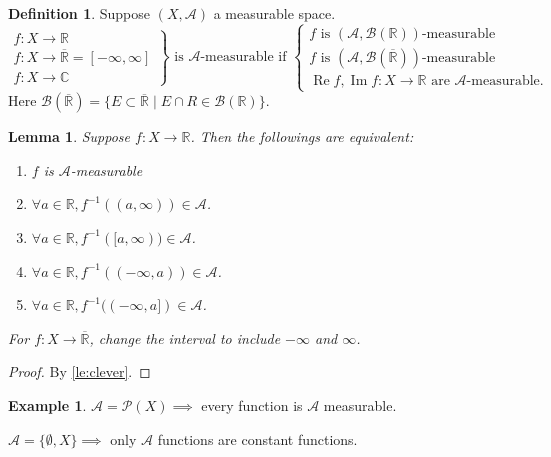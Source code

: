 \documentclass{report}
\newcommand{\R}{\mathbb{R}}
\newcommand{\C}{\mathbb{C}}
\def \im {\operatorname{Im}}
\def \re {\operatorname{Re}}
\newtheorem{lemma}[theorem]{Lemma}
\theoremstyle{definition}
\newtheorem{definition}[theorem]{Definition}
\newtheorem{example}[theorem]{Example}
\theoremstyle{remark}
\begin{document}
\begin{definition}
	Suppose $(X, \mathcal{A})$ a measurable space.
	\[
	\left.\begin{array}{l}
		f: X \to \R \\
		f: X \to \overline{\R} = [-\infty, \infty] \\
		f: X \to \C
	\end{array}	\right\rbrace \text{ is $\mathcal{A}$-measurable if }
	\left\lbrace\begin{array}{l}
		f \text{ is $(\mathcal{A}, \mathcal{B}(\R))$-measurable} \\
		f \text{ is $(\mathcal{A}, \mathcal{B}(\overline{\R}))$-measurable} \\
		\re f, \im f: X \to \R \text{ are $\mathcal{A}$-measurable.}
	\end{array}\right.
	\]
	Here $\mathcal{B}(\overline{\R}) = \{E \subset \overline{\R} \mid E \cap R \in \mathcal{B}(\R)\}$.
\end{definition}

\begin{lemma}
	Suppose $f: X \to \R$. Then the followings are equivalent:
	\begin{enumerate}
		\item $f$ is $\mathcal{A}$-measurable
		\item $\forall a \in \R, f^{-1}((a, \infty)) \in \mathcal{A}$.
		\item $\forall a \in \R, f^{-1}([a, \infty)) \in \mathcal{A}$.
		\item $\forall a \in \R, f^{-1}((-\infty, a)) \in \mathcal{A}$.
		\item $\forall a \in \R, f^{-1}((-\infty, a]) \in \mathcal{A}$.
	\end{enumerate}
	For $f: X \to \overline{\R}$, change the interval to include $-\infty$ and $\infty$.
\end{lemma}
\begin{proof}
	By \ref{le:clever}.
\end{proof}



\begin{example}
	$\mathcal{A} = \mathcal{P}(X) \implies$ every function is $\mathcal{A}$ measurable.

	$\mathcal{A} = \{\emptyset, X\} \implies$ only $\mathcal{A}$ functions are constant functions.
\end{example}
\end{document}
